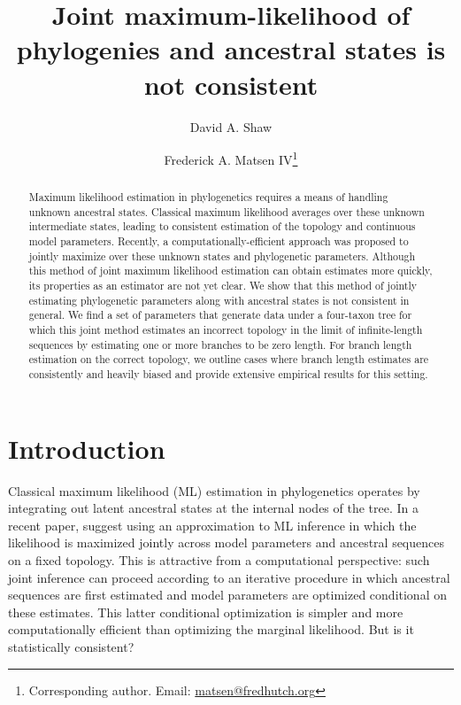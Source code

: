 \documentclass[11pt]{article}
\title{Joint maximum-likelihood of phylogenies and ancestral states is not consistent}
\author[1]{David A. Shaw}
\author[1]{Frederick A. Matsen IV\thanks{Corresponding author. Email: \url{matsen@fredhutch.org}}}
\affil[1]{Computational Biology Program, Fred Hutchinson Cancer Research Center\\ Seattle, WA, USA}
\date{}
\begin{document}
\renewcommand{\arraystretch}{1.2} %

\maketitle

\begin{abstract}
Maximum likelihood estimation in phylogenetics requires a means of handling unknown ancestral states.
Classical maximum likelihood averages over these unknown intermediate states, leading to consistent estimation of the topology and continuous model parameters.
Recently, a computationally-efficient approach was proposed to jointly maximize over these unknown states and phylogenetic parameters.
Although this method of joint maximum likelihood estimation can obtain estimates more quickly, its properties as an estimator are not yet clear.
We show that this method of jointly estimating phylogenetic parameters along with ancestral states is not consistent in general.
We find a set of parameters that generate data under a four-taxon tree for which this joint method estimates an incorrect topology in the limit of infinite-length sequences by estimating one or more branches to be zero length.
For branch length estimation on the correct topology, we outline cases where branch length estimates are consistently and heavily biased and provide extensive empirical results for this setting.
\end{abstract}

\newpage

\section*{Introduction}

Classical maximum likelihood (ML) estimation in phylogenetics operates by integrating out latent ancestral states at the internal nodes of the tree.
In a recent paper, \citet{Sagulenko2018-xl} suggest using an approximation to ML inference in which the likelihood is maximized jointly across model parameters and ancestral sequences on a fixed topology.
This is attractive from a computational perspective: such joint inference can proceed according to an iterative procedure in which ancestral sequences are first estimated and model parameters are optimized conditional on these estimates.
This latter conditional optimization is simpler and more computationally efficient than optimizing the marginal likelihood.
But is it statistically consistent?
\end{document}
